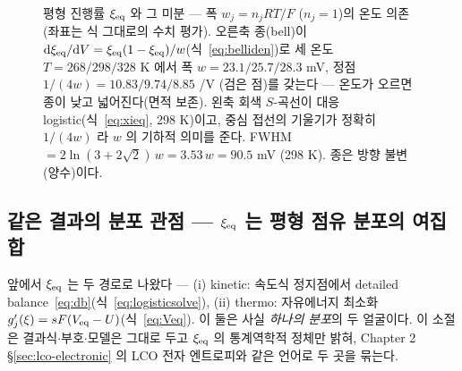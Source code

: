 \begin{figure}[t]
\caption{평형 진행률 $\xi_{\mathrm{eq}}$ 와 그 미분 --- 폭 $w_j{=}n_jRT/F$ ($n_j{=}1$)의 온도 의존(좌표는 식 그대로의
수치 평가). 오른축 종(bell)이 $\mathrm{d}\xi_{\mathrm{eq}}/\mathrm{d} V=\xi_{\mathrm{eq}}(1-\xi_{\mathrm{eq}})/w$(식~\eqref{eq:belliden})로 세 온도
$T{=}268/298/328$ K 에서 폭 $w{=}23.1/25.7/28.3$ mV, 정점 $1/(4w){=}10.83/9.74/8.85$ /V (검은 점)를 갖는다
--- 온도가 오르면 종이 낮고 넓어진다(면적 보존). 왼축 회색 $S$-곡선이 대응 logistic(식~\eqref{eq:xieq}, 298 K)이고,
중심 접선의 기울기가 정확히 $1/(4w)$ 라 $w$ 의 기하적 의미를 준다. FWHM $=2\ln(3{+}2\sqrt2)\,w=3.53\,w=90.5$ mV
(298 K). 종은 방향 불변(양수)이다.}
\label{fig:logistic}
\end{figure}

\subsection{같은 결과의 분포 관점 --- $\xi_{\mathrm{eq}}$ 는 평형 점유 분포의 여집합}\label{sec:dist}
앞에서 $\xi_{\mathrm{eq}}$ 는 두 경로로 나왔다 --- (i) kinetic: 속도식 정지점에서 detailed balance~\eqref{eq:db}(식~\eqref{eq:logisticsolve}),
(ii) thermo: 자유에너지 최소화 $g_j'(\xi)=sF(V_{\mathrm{eq}}-U)$(식~\eqref{eq:Veq}). 이 둘은 사실 \emph{하나의 분포}의 두 얼굴이다.
이 소절은 결과식$\cdot$부호$\cdot$모델은 그대로 두고 $\xi_{\mathrm{eq}}$ 의 통계역학적 정체만 밝혀,
Chapter 2 \S\ref{sec:lco-electronic} 의 LCO 전자 엔트로피와 같은 언어로 두 곳을 묶는다.

